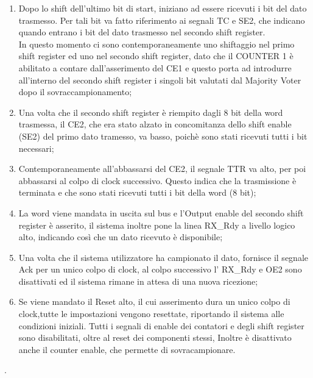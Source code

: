 \documentclass[a4paper, titlepage]{article}
\begin{document}
\begin{enumerate}
    \item Dopo lo shift dell'ultimo bit di start, iniziano ad essere ricevuti i bit del dato trasmesso. Per tali bit va fatto riferimento ai segnali TC e SE2, che indicano quando entrano i bit del dato trasmesso nel secondo shift register.\\ In questo momento ci sono contemporaneamente uno shiftaggio nel primo shift register ed uno nel secondo shift register, dato che il COUNTER 1 è abilitato a contare dall'asserimento del CE1 e questo porta ad introdurre all’interno del secondo shift register i singoli bit valutati dal Majority Voter dopo il sovraccampionamento;
    \item Una volta che il secondo shift register è riempito dagli 8 bit della word trasmessa, il CE2, che era stato alzato in concomitanza dello shift enable (SE2) del primo dato tramesso, va basso, poichè sono stati ricevuti tutti i bit necessari;
    \item Contemporaneamente all'abbassarsi del CE2, il segnale TTR va alto, per poi abbassarsi al colpo di clock successivo. Questo indica che la trasmissione è terminata e che sono stati ricevuti tutti i bit della word (8 bit);
    \item La word viene mandata in uscita sul bus e l'Output enable del secondo shift register è asserito, il sistema inoltre pone la linea RX\_Rdy a livello logico alto, indicando così che un dato ricevuto è disponibile;
    \item Una volta che il sistema utilizzatore ha campionato il dato, fornisce il segnale Ack per un unico colpo di clock, al colpo successivo l' RX\_Rdy e OE2 sono disattivati ed il sistema rimane in attesa di una nuova ricezione;
    \item Se viene mandato il Reset alto, il cui asserimento dura un unico colpo di clock,tutte le impostazioni vengono resettate, riportando il sistema alle condizioni iniziali. Tutti i segnali di enable dei contatori e degli shift register sono disabilitati, oltre al reset dei componenti stessi, Inoltre è disattivato anche il counter enable, che permette di sovracampionare. 
    \end{enumerate}.
\newpage
\end{document}

